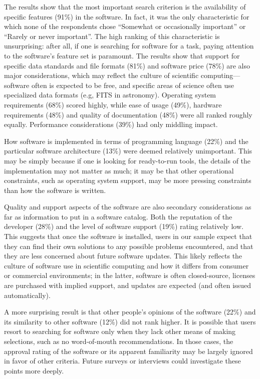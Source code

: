 \documentclass{casicswhitepaper}
\begin{document}
The results show that the most important search criterion is the availability of specific features (91\%) in the software.  In fact, it was the only characteristic for which none of the respondents chose ``Somewhat or occasionally important'' or ``Rarely or never important''.  The high ranking of this characteristic is unsurprising: after all, if one is searching for software for a task, paying attention to the software's feature set is paramount.  The results show that support for specific data standards and file formats (81\%) and software price (78\%) are also major considerations, which may reflect the culture of scientific computing---software often is expected to be free, and specific areas of science often use specialized data formats (e.g, FITS in astronomy).  Operating system requirements (68\%) scored highly, while ease of usage (49\%), hardware requirements (48\%) and quality of documentation (48\%) were all ranked roughly equally.  Performance considerations (39\%) had only middling impact.

How software is implemented in terms of programming language (22\%) and the particular software architecture (13\%) were deemed relatively unimportant.  This may be simply because if one is looking for ready-to-run tools, the details of the implementation may not matter as much; it may be that other operational constraints, such as operating system support, may be more pressing constraints than how the software is written.


Quality and support aspects of the software are also secondary considerations as far as information to put in a software catalog.  Both the reputation of the developer (28\%) and the level of software support (19\%) rating relatively low.  This suggests that once the software is installed, users in our sample expect that they can find their own solutions to any possible problems encountered, and that they are less concerned about future software updates. This likely reflects the culture of software use in scientific computing and how it differs from consumer or commercial environments; in the latter, software is often closed-source, licenses are purchased with implied support, and updates are expected (and often issued automatically).

A more surprising result is that other people's opinions of the software (22\%) and its similarity to other software (12\%) did not rank higher.  It is possible that users resort to searching for software only when they lack other means of making selections, such as no word-of-mouth recommendations. In those cases, the approval rating of the software or its apparent familiarity may be largely ignored in favor of other criteria.  Future surveys or interviews could investigate these points more deeply.
\end{document}
